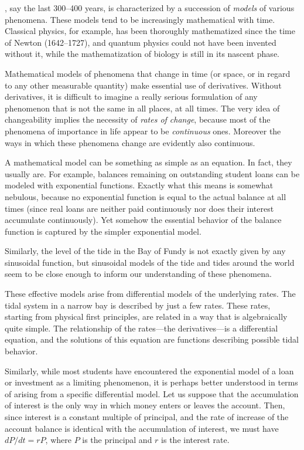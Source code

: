 \documentclass[symmetric]{tufte-handout}
\begin{document}
, say the last 300–400
years, is characterized by a succession of \emph{models} of various phenomena.
These models tend to be increasingly mathematical with time. Classical
physics, for example, has been thoroughly mathematized since the time of
Newton (1642–1727), and quantum physics could not have been invented without
it, while the mathematization of biology is still in its nascent phase.

Mathematical models of phenomena that change in time (or space, or in regard
to any other measurable quantity) make essential use of derivatives. Without
derivatives, it is difficult to imagine a really serious formulation of
any phenomenon that is not the same in all places, at all times. The very idea
of changeability implies the necessity of \emph{rates of change}, because 
most of the phenomena of importance in life appear to be \emph{continuous} ones.
Moreover the ways in which these phenomena change are evidently also 
continuous.

A mathematical model can be something as simple as an equation. In fact, they
usually are. For example, balances remaining on outstanding student loans
can be modeled with exponential functions. Exactly what this means is 
somewhat nebulous, because no exponential function is equal to the actual
balance at all times (since real loans are neither paid continuously nor does
their interest accumulate continuously). Yet somehow the essential behavior
of the balance function is captured by the simpler exponential model.

Similarly, the level of the tide in the Bay of Fundy is not exactly given
by any sinusoidal function, but sinusoidal models of the tide and tides
around the world seem to be close enough to inform our understanding of these
phenomena.

These effective models arise from differential models of the underlying
rates. The tidal system in a narrow bay is described by just a few rates.
These rates, starting from physical first principles, are related in a 
way that is algebraically quite simple. The relationship of the rates—the
derivatives—is a differential equation, and the solutions of this equation
are functions describing possible tidal behavior.

Similarly, while most students have encountered the exponential model of
a loan or investment as a limiting phenomenon,%
it is perhaps better understood in terms of arising from a specific differential
model. Let us suppose that the accumulation of interest is the only way in 
which money enters or leaves the account. Then, since interest is a constant 
multiple of principal,%
and the rate of increase of the account balance is identical with the accumulation
of interest, we must have $dP/dt = rP$, where $P$ is the principal and $r$ is
the interest rate.
\end{document}
